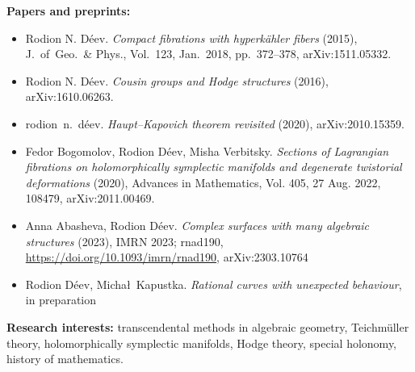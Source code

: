 \documentclass{article}
\begin{document}
\begin{description}
\item {\bf Papers and preprints:} \begin{itemize}
     \item Rodion N. D\'eev. {\em 
     Compact fibrations with hyperk\"ahler fibers} (2015), J.~of~Geo.~\& Phys., 
     Vol.~123, Jan.~2018, pp.~372--378, arXiv:1511.05332.
     \item Rodion N. D\'eev. {\em
     Cousin groups and Hodge structures} (2016), arXiv:1610.06263.
     \item rodion~n.~d\'eev. {\em Haupt--Kapovich theorem revisited} (2020),
     arXiv:2010.15359.
     \item Fedor Bogomolov, Rodion D\'eev, Misha Verbitsky. {\em 
     Sections of Lagrangian fibrations on holomorphically symplectic manifolds 
     and degenerate twistorial deformations} (2020),  Advances in Mathematics, 
     Vol.  405,  27 Aug.  2022,  108479,  arXiv:2011.00469.
     \item Anna Abasheva,  Rodion D\'eev.  {\em Complex surfaces with many 
     algebraic  structures} (2023),  IMRN 2023;  rnad190,  
     \url{https://doi.org/10.1093/imrn/rnad190},  arXiv:2303.10764
     \item Rodion D\'eev,  Micha\l~Kapustka.  {\em Rational curves with unexpected
     behaviour},  in preparation
\end{itemize}
\vspace{1mm}

\item {\bf Research interests:} transcendental methods in algebraic geometry, 
Teichm\"uller theory, holomorphically symplectic manifolds, Hodge theory, 
special holonomy, history of mathematics.

\end{description}
\end{document}
